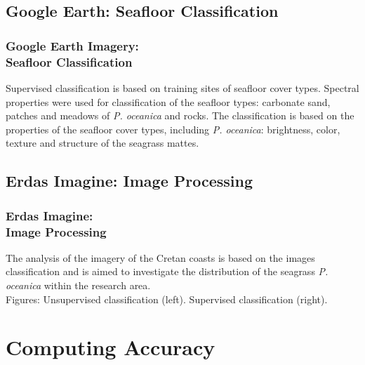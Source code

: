 \documentclass[pdflatex,compress,9pt,
	xcolor={dvipsnames,dvipsnames,svgnames,x11names,table},
	hyperref={colorlinks = true,breaklinks = true, urlcolor = NavyBlue, breaklinks = true}]{beamer}
\begin{document}
\subsection{Google Earth: Seafloor Classification}
\begin{frame}\frametitle{Google Earth Imagery: \\Seafloor Classification}
\footnotesize{Supervised classification is based on training sites of seafloor cover types. Spectral properties were used for classification of the seafloor types: carbonate sand, patches and meadows of \emph{P. oceanica} and rocks. The classification is based on the properties of the seafloor cover types, including \emph{P. oceanica}: brightness, color, texture and structure of the seagrass mattes.}
\begin{figure}[H]
	\centering
			\hspace{1mm}
\end{figure}
\end{frame}

\subsection{Erdas Imagine: Image Processing}
\begin{frame}\frametitle{Erdas Imagine: \\Image Processing}
\footnotesize{The analysis of the imagery of the Cretan coasts is based on the images classification and is aimed to investigate the distribution of the seagrass \emph{P. oceanica} within the research area. \\
Figures: Unsupervised classification (left). Supervised classification (right).}
\begin{figure}[H]
	\centering
			\hspace{1mm}
\end{figure}
\end{frame}

\section{Computing Accuracy}
\end{document}
